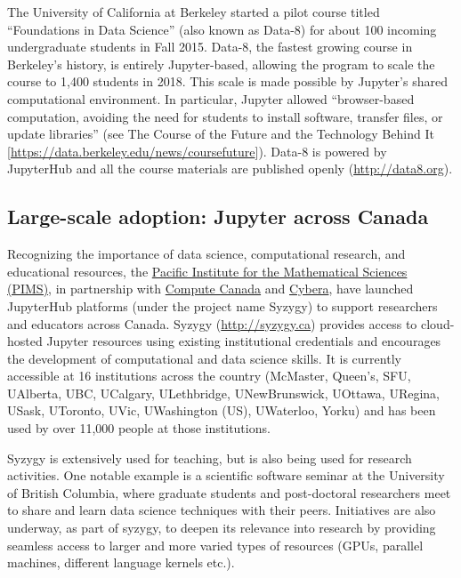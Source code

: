 \documentclass[]{book}
\begin{document}
The University of California at Berkeley started a pilot course titled
``Foundations in Data Science'' (also known as Data-8) for about 100
incoming undergraduate students in Fall 2015. Data-8, the fastest
growing course in Berkeley's history, is entirely Jupyter-based,
allowing the program to scale the course to 1,400 students in 2018. This
scale is made possible by Jupyter's shared computational environment. In
particular, Jupyter allowed ``browser-based computation, avoiding the
need for students to install software, transfer files, or update
libraries'' (see The Course of the Future and the Technology Behind It
{[}\url{https://data.berkeley.edu/news/coursefuture}{]}). Data-8 is
powered by JupyterHub and all the course materials are published openly
(\url{http://data8.org}).

\subsection{Large-scale adoption: Jupyter across
Canada}\label{large-scale-adoption-jupyter-across-canada}

Recognizing the importance of data science, computational research, and
educational resources, the \href{https://www.pims.math.ca/}{Pacific
Institute for the Mathematical Sciences (PIMS)}, in partnership with
\href{https://www.computecanada.ca/}{Compute Canada} and
\href{https://www.cybera.ca/}{Cybera}, have launched JupyterHub
platforms (under the project name Syzygy) to support researchers and
educators across Canada. Syzygy (\url{http://syzygy.ca}) provides access
to cloud-hosted Jupyter resources using existing institutional
credentials and encourages the development of computational and data
science skills. It is currently accessible at 16 institutions across the
country (McMaster, Queen's, SFU, UAlberta, UBC, UCalgary, ULethbridge,
UNewBrunswick, UOttawa, URegina, USask, UToronto, UVic, UWashington
(US), UWaterloo, Yorku) and has been used by over 11,000 people at those
institutions.

Syzygy is extensively used for teaching, but is also being used for
research activities. One notable example is a scientific software
seminar at the University of British Columbia, where graduate students
and post-doctoral researchers meet to share and learn data science
techniques with their peers. Initiatives are also underway, as part of
syzygy, to deepen its relevance into research by providing seamless
access to larger and more varied types of resources (GPUs, parallel
machines, different language kernels etc.).
\end{document}
